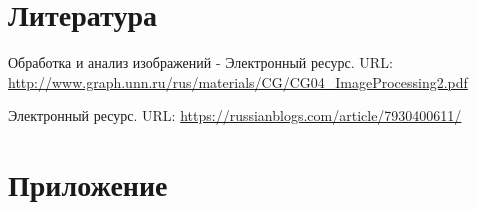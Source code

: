 \documentclass{report}
\begin{document}
\newpage

\section*{Литература}
\par Обработка и анализ изображений - Электронный ресурс. URL: \url{http://www.graph.unn.ru/rus/materials/CG/CG04_ImageProcessing2.pdf}
\par Электронный ресурс. URL: \url{https://russianblogs.com/article/7930400611/}

\newpage

\section*{Приложение}
\end{document}
